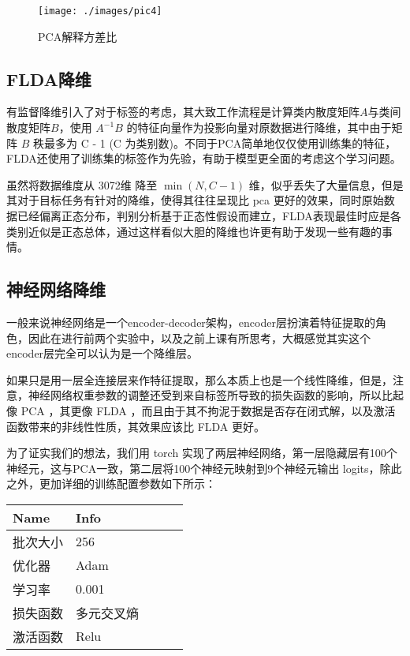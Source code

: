 \documentclass[fleqn]{Paquetes/RevDigMatEduInt}
\begin{document}
\begin{figure}[h]
	\centering
	\texttt{[image: ./images/pic4]}
	\caption{PCA解释方差比}
\end{figure}


\subsection{FLDA降维}
有监督降维引入了对于标签的考虑，其大致工作流程是计算类内散度矩阵$A$与类间散度矩阵$B$，使用 $A^{-1}B$ 的特征向量作为投影向量对原数据进行降维，其中由于矩阵 $B$ 秩最多为 C - 1 (C 为类别数)。不同于PCA简单地仅仅使用训练集的特征，FLDA还使用了训练集的标签作为先验，有助于模型更全面的考虑这个学习问题。

虽然将数据维度从 3072维 降至 $\min(N,C - 1)$ 维，似乎丢失了大量信息，但是其对于目标任务有针对的降维，使得其往往呈现比 pca 更好的效果，同时原始数据已经偏离正态分布，判别分析基于正态性假设而建立，FLDA表现最佳时应是各类别近似是正态总体，通过这样看似大胆的降维也许更有助于发现一些有趣的事情。


\subsection{神经网络降维}
一般来说神经网络是一个encoder-decoder架构，encoder层扮演着特征提取的角色，因此在进行前两个实验中，以及之前上课有所思考，大概感觉其实这个encoder层完全可以认为是一个降维层。

如果只是用一层全连接层来作特征提取，那么本质上也是一个线性降维，但是，注意，神经网络权重参数的调整还受到来自标签所导致的损失函数的影响，所以比起像 PCA ，其更像 FLDA ，而且由于其不拘泥于数据是否存在闭式解，以及激活函数带来的非线性性质，其效果应该比 FLDA 更好。

为了证实我们的想法，我们用 torch 实现了两层神经网络，第一层隐藏层有100个神经元，这与PCA一致，第二层将100个神经元映射到9个神经元输出 logits，除此之外，更加详细的训练配置参数如下所示：

\begin{table}[ht!!!]
	\centering
	\begin{minipage}{0.5\textwidth}
		\centering
		\begin{tabular}{*5l}    \toprule
			Name & Info \\ \midrule
			批次大小    & 256  \\ 
			优化器  & Adam\\ 
			学习率 & 0.001\\ 
			损失函数  & 多元交叉熵 \\  
			激活函数 & Relu \\ \bottomrule
		\end{tabular}
	\end{minipage}
\end{table}
\end{document}
